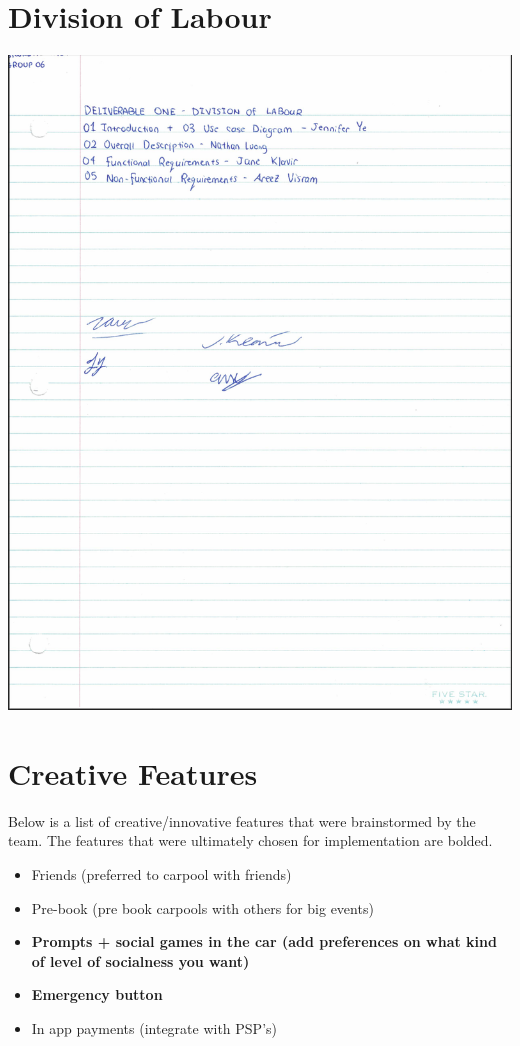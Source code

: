 \documentclass[]{article}
\begin{document}


\newpage
\appendix
\section{Division of Labour}
\label{sec:division_of_labour}
\includegraphics[scale=0.75]{division_of_labour.png}

\section{Creative Features}
\label{sec:creative_features}
Below is a list of creative/innovative features that were brainstormed by the team. The features that were ultimately chosen for implementation are bolded.
\begin{itemize}
	\item Friends (preferred to carpool with friends)
	\item Pre-book (pre book carpools with others for big events)
	\item \textbf{Prompts + social games in the car (add preferences on what kind of level of socialness you want)} 
	\item \textbf{Emergency button}
	\item In app payments (integrate with PSP's) 

\end{itemize}
\end{document}
